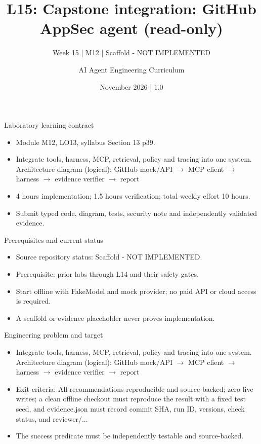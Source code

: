 \documentclass[aspectratio=169,10pt]{beamer}
\title[L15 - Agent Engineering]{L15: Capstone integration: GitHub AppSec agent (read-only)}
\subtitle{Week 15 | M12 | Scaffold - NOT IMPLEMENTED}
\author{AI Agent Engineering Curriculum}
\date{November 2026 | 1.0}
\begin{document}
\begin{frame}\titlepage\end{frame}

\begin{frame}{Laboratory learning contract}
\small
\begin{itemize}
\item Module M12, LO13, syllabus Section 13 p39.
\item Integrate tools, harness, MCP, retrieval, policy and tracing into one system. Architecture diagram (logical): GitHub mock/API $\rightarrow$ MCP client $\rightarrow$ harness $\rightarrow$ evidence verifier $\rightarrow$ report
\item 4 hours implementation; 1.5 hours verification; total weekly effort 10 hours.
\item Submit typed code, diagram, tests, security note and independently validated evidence.
\end{itemize}

\end{frame}

\begin{frame}{Prerequisites and current status}
\small
\begin{itemize}
\item Source repository status: Scaffold - NOT IMPLEMENTED.
\item Prerequisite: prior labs through L14 and their safety gates.
\item Start offline with FakeModel and mock provider; no paid API or cloud access is required.
\item A scaffold or evidence placeholder never proves implementation.
\end{itemize}

\end{frame}

\begin{frame}{Engineering problem and target}
\small
\begin{itemize}
\item Integrate tools, harness, MCP, retrieval, policy and tracing into one system. Architecture diagram (logical): GitHub mock/API $\rightarrow$ MCP client $\rightarrow$ harness $\rightarrow$ evidence verifier $\rightarrow$ report
\item Exit criteria: All recommendations reproducible and source-backed; zero live writes; a clean offline checkout must reproduce the result with a fixed test seed, and evidence.json must record commit SHA, run ID, versions, check status, and reviewer/...
\item The success predicate must be independently testable and source-backed.
\end{itemize}

\end{frame}
\end{document}
